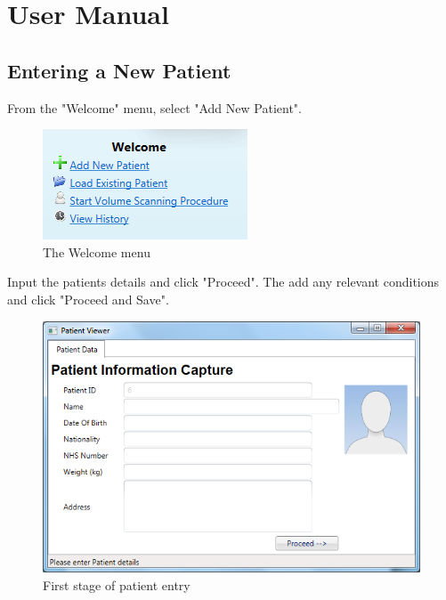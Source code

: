 \chapter{User Manual}
\label{user manual}



\section*{Entering a New Patient}
From the "Welcome" menu, select "Add New Patient".\\

\begin{figure}[h]
\begin{center}
\includegraphics[scale=1]{images/welcome}
\end{center}
\caption{The Welcome menu}
\label{the welcome menu}
\end{figure}

Input the patients details and click "Proceed". The add any relevant conditions and click "Proceed and Save".\\

\begin{figure}[h]
\begin{center}
\includegraphics[scale=0.6]{images/details}
\end{center}
\caption{First stage of patient entry}
\label{first stage of patient entry}
\end{figure}

